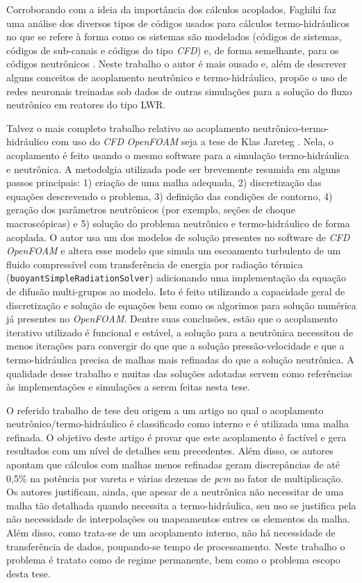 Corroborando com a ideia da importância dos cálculos acoplados, Faghihi faz uma análise
dos diversos tipos de códigos usados para cálculos termo-hidráulicos no que se refere à
forma como os sistemas são modelados (códigos de sistemas, códigos de sub-canais e códigos
do tipo \textit{CFD}) e, de forma semelhante, para os códigos neutrônicos \cite{Faghihi2011}. Neste
trabalho o autor é mais ousado e, além de descrever alguns conceitos de acoplamento
neutrônico e termo-hidráulico, propõe o uso de redes neuronais treinadas sob dados de
outras simulações para a solução do fluxo neutrônico em reatores do tipo LWR.

Talvez o mais completo trabalho relativo ao acoplamento neutrônico-termo-hidráulico com uso do 
\textit{CFD} \textit{OpenFOAM} seja a tese de Klas Jareteg \cite{Jareteg2012}. Nela, o acoplamento é feito usando o mesmo 
software para a simulação termo-hidráulica e neutrônica. A metodolgia utilizada pode ser brevemente 
resumida em alguns passos principais: 1) criação de uma malha adequada, 2) discretização das 
equações descrevendo o problema, 3) definição das condições de contorno, 4) geração dos 
parâmetros neutrônicos (por exemplo, seções de choque macroscópicas) e 5) solução do 
problema neutrônico e termo-hidráulico de forma acoplada. O autor usa um dos modelos de solução presentes no 
software de \textit{CFD} \textit{OpenFOAM} \cite{OpenFOAM2013} e 
altera esse modelo que simula um escoamento turbulento de um fluido compressível com transferência de energia
por radiação térmica (\texttt{buoyantSimpleRadiationSolver}) adicionando uma implementação da equação de difusão multi-grupos 
ao modelo. Isto é feito utilizando a capacidade geral de discretização e solução de equações bem como os algorimos 
para solução numérica já presentes no \textit{OpenFOAM}. Dentre suas conclusões, estão que o acoplamento iterativo 
utilizado é funcional e estável, a solução para a neutrônica necessitou de menos iterações para convergir 
do que que a solução pressão-velocidade e que a termo-hidráulica precisa de malhas mais refinadas do que a solução 
neutrônica. A qualidade desse trabalho e muitas das soluções adotadas servem como referências às implementações 
e simulações a serem feitas nesta tese.

O referido trabalho de tese deu origem a um artigo \cite{Jareteg2014} no qual o acoplamento
neutrônico/termo-hidráulico é classificado como interno e é utilizada uma malha
refinada. O objetivo deste artigo é provar que
este acoplamento é factível e gera resultados com um nível de detalhes sem precedentes. Além
disso, os autores apontam que cálculos com malhas menos refinadas geram discrepâncias
de até 0,5\% na potência por vareta e várias dezenas de \textit{pcm} no fator de multiplicação.
Os autores justificam, ainda, que apesar de a neutrônica não necessitar de uma malha
tão detalhada quando necessita a termo-hidráulica, seu uso se justifica pela não necessidade
de interpolações ou mapeamentos entres os elementos da malha. Além disso, como trata-se
de um acoplamento interno, não há necessidade de transferência de dados, poupando-se
tempo de processamento.
Neste trabalho o problema é tratato como de regime permanente, bem como o problema escopo
desta tese.

